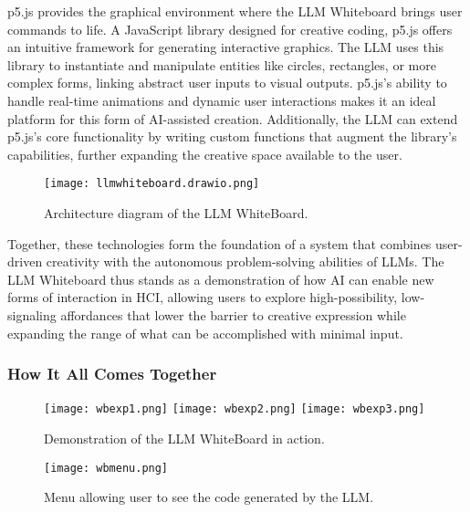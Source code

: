 p5.js provides the graphical environment where the LLM Whiteboard brings user commands to life.
A JavaScript library designed for creative coding, p5.js offers an intuitive framework for generating interactive graphics.
The LLM uses this library to instantiate and manipulate entities like circles, rectangles, or more complex forms, linking abstract user inputs to visual outputs.
p5.js’s ability to handle real-time animations and dynamic user interactions makes it an ideal platform for this form of AI-assisted creation.
Additionally, the LLM can extend p5.js's core functionality by writing custom functions that augment the library’s capabilities, further expanding the creative space available to the user.

\begin{figure}[h!]
    \centering
    \texttt{[image: llmwhiteboard.drawio.png]}
    \caption{Architecture diagram of the LLM WhiteBoard.}
    \vspace{0.1cm}
    \label{fig:wbarchietcure}
\end{figure}

Together, these technologies form the foundation of a system that combines user-driven creativity with the autonomous problem-solving abilities of LLMs.
The LLM Whiteboard thus stands as a demonstration of how AI can enable new forms of interaction in HCI, allowing users to explore high-possibility, low-signaling affordances that lower the barrier to creative expression while expanding the range of what can be accomplished with minimal input.

\subsubsection{ How It All Comes Together}


\begin{figure}[h!]
    \centering
    \texttt{[image: wbexp1.png]}
    \texttt{[image: wbexp2.png]}
    \texttt{[image: wbexp3.png]}
    \caption{Demonstration of the LLM WhiteBoard in action.}
    \vspace{0.1cm}
    \label{fig:wbdemo1}
\end{figure}

\begin{figure}[h!]
    \centering
    \texttt{[image: wbmenu.png]}
    \caption{Menu allowing user to see the code generated by the LLM.}
    \vspace{0.1cm}
    \label{fig:wbmenu}
\end{figure}